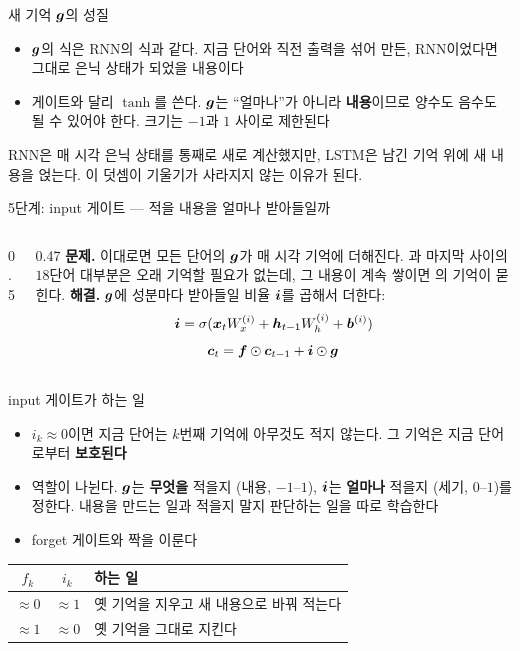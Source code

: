 \documentclass[aspectratio=169,11pt]{beamer}
\begin{document}
\begin{frame}{새 기억 $\bm{g}$의 성질}
\begin{itemize}
\item $\bm{g}$의 식은 RNN의 식과 같다.
지금 단어와 직전 출력을 섞어 만든, RNN이었다면 그대로 은닉 상태가 되었을 내용이다
\item 게이트와 달리 $\tanh$를 쓴다. $\bm{g}$는 ``얼마나''가 아니라 \textbf{내용}이므로
양수도 음수도 될 수 있어야 한다. 크기는 $-1$과 $1$ 사이로 제한된다
\end{itemize}
\vskip3mm
\begin{keybox}
RNN은 매 시각 은닉 상태를 통째로 새로 계산했지만, LSTM은 남긴 기억 위에 새 내용을 얹는다.
이 덧셈이 기울기가 사라지지 않는 이유가 된다.
\end{keybox}
\end{frame}

\begin{frame}{5단계: input 게이트 --- 적을 내용을 얼마나 받아들일까}
\begin{columns}[c,onlytextwidth]
\begin{column}{0.5\textwidth}
\end{column}
\begin{column}{0.47\textwidth}
\small
\textbf{문제.} 이대로면 모든 단어의 $\bm{g}$가 매 시각 기억에 더해진다.
과 마지막  사이의 $18$단어 대부분은 오래 기억할 필요가 없는데,
그 내용이 계속 쌓이면 의 기억이 묻힌다.
\vskip3mm
\textbf{해결.} $\bm{g}$에 성분마다 받아들일 비율 $\bm{i}$를 곱해서 더한다:
\[
\bm{i}=\sigma(\bm{x}_tW_x^{(i)}+\bm{h}_{t-1}W_h^{(i)}+\bm{b}^{(i)})
\]
\[
\bm{c}_t=\bm{f}\odot\bm{c}_{t-1}+\bm{i}\odot\bm{g}
\]
\end{column}
\end{columns}
\end{frame}

\begin{frame}{input 게이트가 하는 일}
\begin{itemize}
\item $i_k\approx0$이면 지금 단어는 $k$번째 기억에 아무것도 적지 않는다.
그 기억은 지금 단어로부터 \textbf{보호된다}
\item 역할이 나뉜다. $\bm{g}$는 \textbf{무엇을} 적을지 (내용, $-1$--$1$),
$\bm{i}$는 \textbf{얼마나} 적을지 (세기, $0$--$1$)를 정한다.
내용을 만드는 일과 적을지 말지 판단하는 일을 따로 학습한다
\item forget 게이트와 짝을 이룬다
\end{itemize}
\vskip2mm
\centering
\begin{tabular}{@{}ccl@{}}
\toprule
$f_k$ & $i_k$ & 하는 일 \\
\midrule
$\approx0$ & $\approx1$ & 옛 기억을 지우고 새 내용으로 바꿔 적는다 \\
$\approx1$ & $\approx0$ & 옛 기억을 그대로 지킨다 \\
\bottomrule
\end{tabular}
\end{frame}
\end{document}
